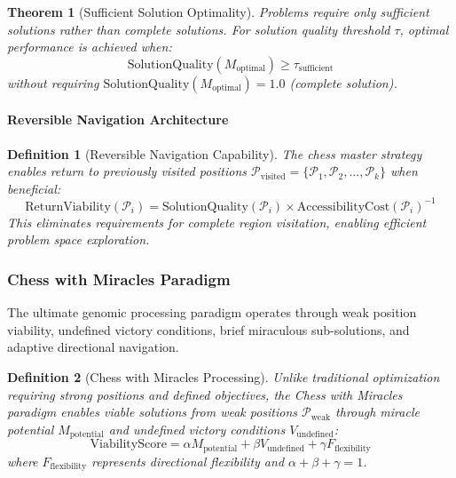 \documentclass[12pt,a4paper]{article}
\newtheorem{theorem}{Theorem}
\newtheorem{definition}{Definition}
\begin{document}
\begin{theorem}[Sufficient Solution Optimality]
Problems require only sufficient solutions rather than complete solutions. For solution quality threshold $\tau$, optimal performance is achieved when:
\begin{equation}
\text{SolutionQuality}(M_{\text{optimal}}) \geq \tau_{\text{sufficient}}
\end{equation}
without requiring $\text{SolutionQuality}(M_{\text{optimal}}) = 1.0$ (complete solution).
\end{theorem}

\paragraph{Reversible Navigation Architecture}

\begin{definition}[Reversible Navigation Capability]
The chess master strategy enables return to previously visited positions $\mathcal{P}_{\text{visited}} = \{\mathcal{P}_1, \mathcal{P}_2, ..., \mathcal{P}_k\}$ when beneficial:
\begin{equation}
\text{ReturnViability}(\mathcal{P}_i) = \text{SolutionQuality}(\mathcal{P}_i) \times \text{AccessibilityCost}(\mathcal{P}_i)^{-1}
\end{equation}
This eliminates requirements for complete region visitation, enabling efficient problem space exploration.
\end{definition}

\subsubsection{Chess with Miracles Paradigm}

The ultimate genomic processing paradigm operates through weak position viability, undefined victory conditions, brief miraculous sub-solutions, and adaptive directional navigation.

\begin{definition}[Chess with Miracles Processing]
Unlike traditional optimization requiring strong positions and defined objectives, the Chess with Miracles paradigm enables viable solutions from weak positions $\mathcal{P}_{\text{weak}}$ through miracle potential $M_{\text{potential}}$ and undefined victory conditions $V_{\text{undefined}}$:
\begin{equation}
\text{ViabilityScore} = \alpha M_{\text{potential}} + \beta V_{\text{undefined}} + \gamma F_{\text{flexibility}}
\end{equation}
where $F_{\text{flexibility}}$ represents directional flexibility and $\alpha + \beta + \gamma = 1$.
\end{definition}
\end{document}
